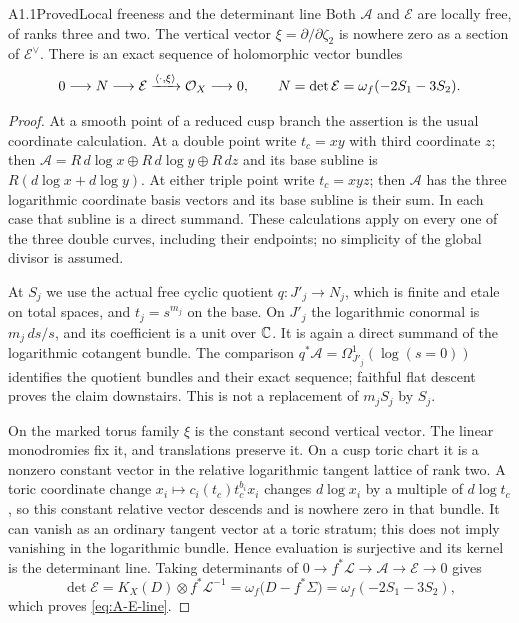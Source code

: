 \begin{claim}{A1.1}{Proved}{Local freeness and the determinant line}
Both $\mathcal A$ and $\mathcal E$ are locally free, of ranks three and
two.  The vertical vector $\xi=\partial/\partial\zeta_2$ is nowhere
zero as a section of $\mathcal E^\vee$.  There is an exact sequence
of holomorphic vector bundles
\begin{equation}\label{eq:A-E-line}
0\longrightarrow N\longrightarrow\mathcal E
 \xrightarrow{\langle\cdot,\xi\rangle}\mathcal O_X\longrightarrow0,
\qquad N=\det\mathcal E=\omega_f(-2S_1-3S_2).
\end{equation}
\end{claim}
\begin{proof}
At a smooth point of a reduced cusp branch the assertion is the usual
coordinate calculation.  At a double point write $t_c=xy$ with third
coordinate $z$; then
$\mathcal A=R\,d\log x\oplus R\,d\log y\oplus R\,dz$ and its
base subline is $R(d\log x+d\log y)$.  At either triple point write
$t_c=xyz$; then $\mathcal A$ has the three logarithmic coordinate
basis vectors and its base subline is their sum.  In each case that
subline is a direct summand.  These calculations apply on every one
of the three double curves, including their endpoints; no simplicity
of the global divisor is assumed.

At $S_j$ we use the actual free cyclic quotient
$q:J'_j\to N_j$, which is finite and etale on total spaces, and
$t_j=s^{m_j}$ on the base.  On $J'_j$ the logarithmic conormal is
$m_j\,ds/s$, and its coefficient is a unit over $\mathbb C$.  It is again a
direct summand of the logarithmic cotangent bundle.  The comparison
$q^*\mathcal A=\Omega_{J'_j}^1(\log(s=0))$ identifies the quotient
bundles and their exact sequence; faithful flat descent proves the
claim downstairs.  This is not a replacement of $m_jS_j$ by $S_j$.

On the marked torus family $\xi$ is the constant second vertical
vector.  The linear monodromies fix it, and translations preserve it.
On a cusp toric chart it is a nonzero constant vector in the relative
logarithmic tangent lattice of rank two.  A toric coordinate change
$x_i\mapsto c_i(t_c)t_c^{b_i}x_i$ changes $d\log x_i$ by a multiple
of $d\log t_c$, so this constant relative vector descends and is
nowhere zero in that bundle.  It can vanish as an ordinary tangent
vector at a toric stratum; this does not imply vanishing in the
logarithmic bundle.  Hence evaluation is surjective and its kernel
is the determinant line.  Taking determinants of
$0\to f^*\mathcal L\to\mathcal A\to\mathcal E\to0$ gives
\[
\det\mathcal E=K_X(D)\otimes f^*\mathcal L^{-1}
=\omega_f\bigl(D-f^*\Sigma\bigr)
=\omega_f(-2S_1-3S_2),
\]
which proves \eqref{eq:A-E-line}.
\end{proof}

